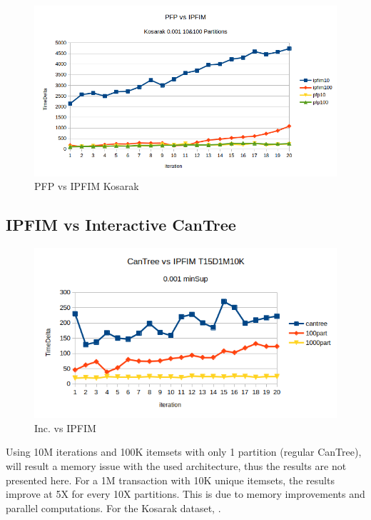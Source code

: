 \begin{figure}
  \centering
  \includegraphics[width=\linewidth]{figures/PFPvsIPFIM0_001_Kosarak}
  \caption{PFP vs IPFIM Kosarak}
  \label{fig:PFPvsIPFPKos}
\end{figure}


\subsection{IPFIM vs Interactive CanTree}
\begin{figure}
  \centering
  \includegraphics[width=\linewidth]{figures/IPFP1M0001}
  \caption{Inc. vs IPFIM}
  \label{fig:IPFP1M0001}
\end{figure}
Using 10M iterations and 100K itemsets with only 1 partition (regular CanTree), will result a memory issue with the used architecture, thus the results are not presented here. For a 1M transaction with 10K unique itemsets, the results improve at 5X for every 10X partitions. This is due to memory improvements and parallel computations.
For the Kosarak dataset, .

